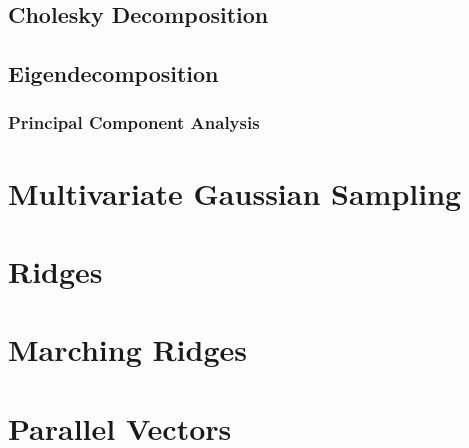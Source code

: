 \subsection{Cholesky Decomposition}



\subsection{Eigendecomposition}

\subsubsection{Principal Component Analysis}

\section{Multivariate Gaussian Sampling} \label{sec:MGS}

\section{Ridges}

\section{Marching Ridges}

\section{Parallel Vectors}
